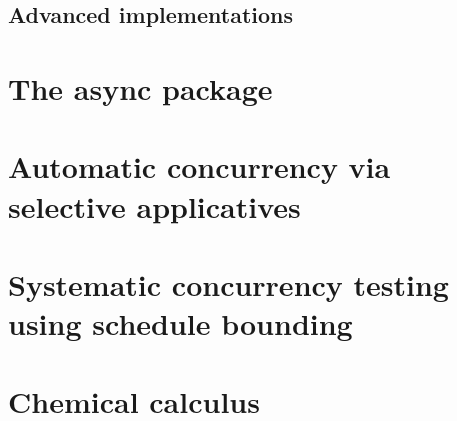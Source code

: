 \documentclass[onecolumn,a4paper,11pt]{article}
\begin{document}
\subsection{Advanced implementations}


\section{The async package}

\section{Automatic concurrency via selective applicatives}

\section{Systematic concurrency testing using schedule bounding}

\section{Chemical calculus}

\printbibliography
\end{document}
